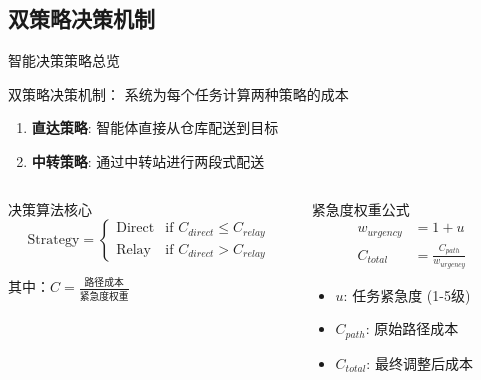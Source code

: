 \documentclass[
10pt,
aspectratio=169,
]{beamer}
\begin{document}
\subsection{双策略决策机制}

\begin{frame}{智能决策策略总览}
    \begin{block}{双策略决策机制：        系统为每个任务计算两种策略的成本}

        \begin{enumerate}
            \item \textbf{直达策略}: 智能体直接从仓库配送到目标
            \item \textbf{中转策略}: 通过中转站进行两段式配送
        \end{enumerate}
    \end{block}
    
    \begin{columns}
        \begin{column}{0.5\textwidth}
            \begin{alertblock}{决策算法核心}
                \begin{equation}
                \text{Strategy} = \begin{cases}
                \text{Direct} & \text{if } C_{direct} \leq C_{relay} \\
                \text{Relay} & \text{if } C_{direct} > C_{relay}
                \end{cases}
                \end{equation}
                
                其中：$C = \frac{\text{路径成本}}{\text{紧急度权重}}$
            \end{alertblock}
        \end{column}
        \begin{column}{0.5\textwidth}
            \begin{exampleblock}{紧急度权重公式}
                \begin{align}
                    w_{urgency} &= 1 + u \\
                    C_{total} &= \frac{C_{path}}{w_{urgency}}
                \end{align}
                \begin{itemize}
                    \item $u$: 任务紧急度 (1-5级)
                    \item $C_{path}$: 原始路径成本
                    \item $C_{total}$: 最终调整后成本
                \end{itemize}
            \end{exampleblock}
        \end{column}
    \end{columns}
\end{frame}
\end{document}
